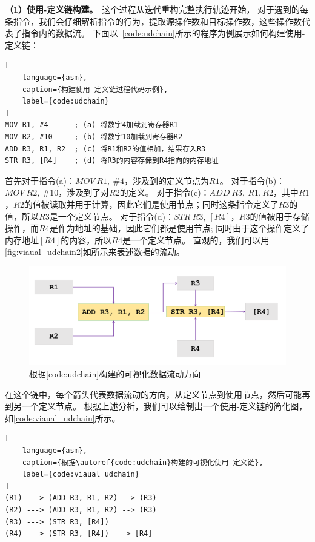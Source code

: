 \textbf{（1）使用-定义链构建。}\ 这个过程从迭代重构完整执行轨迹开始，
对于遇到的每条指令，我们会仔细解析指令的行为，提取源操作数和目标操作数，这些操作数代表了指令内的数据流。
下面以~\autoref{code:udchain}所示的程序为例展示如何构建使用-定义链：
\begin{lstlisting}[
    language={asm},
    caption={构建使用-定义链过程代码示例},
    label={code:udchain}
]
MOV R1, #4      ; (a) 将数字4加载到寄存器R1
MOV R2, #10     ; (b) 将数字10加载到寄存器R2
ADD R3, R1, R2  ; (c) 将R1和R2的值相加，结果存入R3
STR R3, [R4]    ; (d) 将R3的内容存储到R4指向的内存地址
\end{lstlisting}

首先对于指令(a)：$MOV\ R1,\ \#4$，涉及到的定义节点为$R1$。
对于指令(b)：$MOV\ R2,\ \#10$，涉及到了对$R2$的定义。
对于指令(c)：$ADD\ R3,\ R1, R2$，其中$R1$，$R2$的值被读取并用于计算，因此它们是使用节点；同时这条指令定义了$R3$的值，所以$R3$是一个定义节点。
对于指令(d)：$STR\ R3,\ [R4]$，$R3$的值被用于存储操作，而$R4$是作为地址的基础，因此它们都是使用节点;
同时由于这个操作定义了内存地址$[R4]$的内容，所以$R4$是一个定义节点。
直观的，我们可以用\autoref{fig:viaual_udchain2}如所示来表述数据的流动。
\begin{figure}[h]
    \centering
    \includegraphics[width=1.0\textwidth]{./figure/UD-visual.png}
    \caption{根据\autoref{code:udchain}构建的可视化数据流动方向}
    \label{fig:viaual_udchain2}
\end{figure}
在这个链中，每个箭头代表数据流动的方向，从定义节点到使用节点，然后可能再到另一个定义节点。
根据上述分析，我们可以绘制出一个使用-定义链的简化图，如\autoref{code:viaual_udchain}所示。

\begin{lstlisting}[
    language={asm},
    caption={根据\autoref{code:udchain}构建的可视化使用-定义链},
    label={code:viaual_udchain}
]
(R1) ---> (ADD R3, R1, R2) --> (R3)
(R2) ---> (ADD R3, R1, R2) --> (R3)
(R3) ---> (STR R3, [R4])
(R4) ---> (STR R3, [R4]) ---> [R4]
\end{lstlisting}

